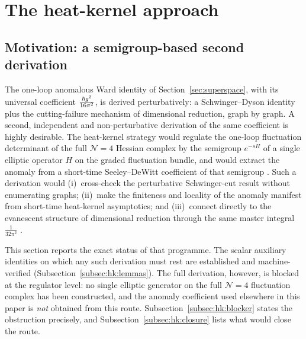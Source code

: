 
\section{The heat-kernel approach}\label{sec:heatkernel}

\subsection{Motivation: a semigroup-based second derivation}

The one-loop anomalous Ward identity of Section~\ref{sec:superspace}, with its
universal coefficient $\frac{\hbar g^2}{16\pi^2}$, is derived perturbatively: a
Schwinger--Dyson identity plus the cutting-failure mechanism of dimensional
reduction, graph by graph. A second, independent and non-perturbative
derivation of the same coefficient is highly desirable. The heat-kernel
strategy would regulate the one-loop fluctuation determinant of the full
$\mathcal N=4$ Hessian complex by the semigroup $e^{-sH}$ of a single elliptic
operator $H$ on the graded fluctuation bundle, and would extract the anomaly
from a short-time Seeley--DeWitt coefficient of that semigroup
\cite{Vassilevich}. Such a derivation would
(i)~cross-check the perturbative Schwinger-cut result without enumerating
graphs;
(ii)~make the finiteness and locality of the anomaly manifest from short-time
heat-kernel asymptotics; and
(iii)~connect directly to the evanescent structure of dimensional reduction
through the same master integral $\frac{1}{32\pi^2}$ \cite{SiegelDRED}.

This section reports the exact status of that programme. The scalar auxiliary
identities on which any such derivation must rest are established and
machine-verified (Subsection~\ref{subsec:hk:lemmas}). The full derivation,
however, is blocked at the regulator level: no single elliptic generator on
the full $\mathcal N=4$ fluctuation complex has been constructed, and the
anomaly coefficient used elsewhere in this paper is \emph{not} obtained from
this route. Subsection~\ref{subsec:hk:blocker} states the obstruction
precisely, and Subsection~\ref{subsec:hk:closure} lists what would close the
route.

